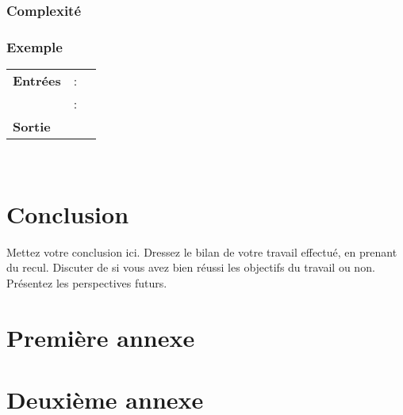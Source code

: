 \documentclass[12pt,a4paper,oneside,titlepage]{report}
\begin{document}
\newpage
\subsection{Complexité}
\newpage 
\subsection{Exemple}

\begin{algorithm}[H]
\caption{}\label{}
\hspace*{\algorithmicindent} 
\begin{tabular}{lll}
	\textbf{Entrées} & \textbf{} : &\\
	&\textbf{} : &\\
	\textbf{Sortie} &\multicolumn{2}{l}{}\\
\end{tabular}\\
\begin{algorithmic}[1]
\State 
\end{algorithmic}
\end{algorithm}




\chapter*{Conclusion}
\renewcommand{\leftmark}{CONCLUSION}

Mettez votre conclusion ici.  Dressez le bilan de votre travail effectué, en prenant du recul. Discuter de si vous avez bien réussi les objectifs du travail ou non. Présentez les perspectives futurs.

\newpage




\newpage
\appendix
{}

\chapter{Premi\`ere annexe}
\renewcommand{\leftmark}{ANNEXE \thechapter.~~Premi\`ere annexe}
\label{annexe1}

\chapter{Deuxi\`eme annexe}
\renewcommand{\leftmark}{ANNEXE \thechapter.~~Deuxi\`eme annexe}
\label{annexe2}

\end{document}
